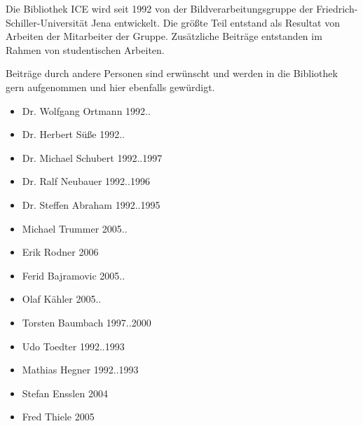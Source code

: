 
Die Bibliothek ICE wird seit 1992 von der Bildverarbeitungsgruppe der
Friedrich-Schiller-Universität Jena entwickelt.
Die größte Teil entstand als Resultat von Arbeiten der Mitarbeiter der Gruppe.
Zusätzliche Beiträge entstanden im Rahmen von studentischen Arbeiten.

Beiträge durch andere Personen sind erwünscht und werden in die Bibliothek
gern aufgenommen und hier ebenfalls gewürdigt.

\begin{itemize}
\item Dr. Wolfgang Ortmann 1992..
\item Dr. Herbert Süße 1992..
\item Dr. Michael Schubert 1992..1997
\item Dr. Ralf Neubauer 1992..1996
\item Dr. Steffen Abraham 1992..1995
\item Michael Trummer 2005..
\item Erik Rodner 2006
\item Ferid Bajramovic 2005..
\item Olaf Kähler 2005..
\item Torsten Baumbach 1997..2000
\item Udo Toedter 1992..1993
\item Mathias Hegner 1992..1993
\item Stefan Ensslen 2004
\item Fred Thiele 2005
\end{itemize}

